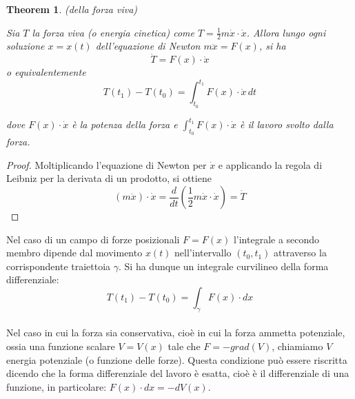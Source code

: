 \documentclass{article}
\newtheorem{theorem}{Theorem}[section]
\begin{document}
            \begin{theorem}(della forza viva)
                \label{thm:Forza viva}

                Sia $T$ la forza viva (o energia cinetica) come $T = \frac{1}{2}m \dot{x} \cdot \dot{x}$.
                Allora lungo ogni soluzione $x = x(t)$ dell'equazione di Newton $m \ddot{x} = F(x)$, si ha 
                \[ \dot{T} = F(x) \cdot \dot{x} \] o equivalentemente \[ T(t_1) - T(t_0) = \int_{t_0}^{t_1} F(x) \cdot \dot{x} \, dt \]

                dove $F(x) \cdot \dot{x}$ è la potenza della forza e $\int_{t_0}^{t_1} F(x) \cdot \dot{x}$ è il lavoro svolto dalla forza. 

            \end{theorem}
            \begin{proof}

                Moltiplicando l'equazione di Newton per $\dot{x}$ e applicando la regola di Leibniz per la derivata di un prodotto, si ottiene
                \[ (m \ddot{x}) \cdot \dot{x} = \frac{d}{dt}(\frac{1}{2} m \dot{x} \cdot \dot{x}) = \dot{T} \]

            \end{proof} 

            Nel caso di un campo di forze posizionali $F = F(x)$ l'integrale a secondo membro dipende dal movimento $x(t)$ nell'intervallo $(t_0, t_1)$ 
            attraverso la corrispondente traiettoia $\gamma$. Si ha dunque un integrale curvilineo della forma differenziale: 
            \[ T(t_1) - T(t_0) = \int_{\gamma} F(x) \cdot dx \] \\
            Nel caso in cui la forza sia conservativa, cioè in cui la forza ammetta potenziale, ossia una funzione scalare $V = V(x)$ tale che $F = - grad(V)$, 
            chiamiamo $V$ energia potenziale (o funzione delle forze). Questa condizione può essere riscritta dicendo che la forma differenziale del lavoro 
            è esatta, cioè è il differenziale di una funzione, in particolare: $F(x) \cdot dx = -dV(x)$. \\
\end{document}

